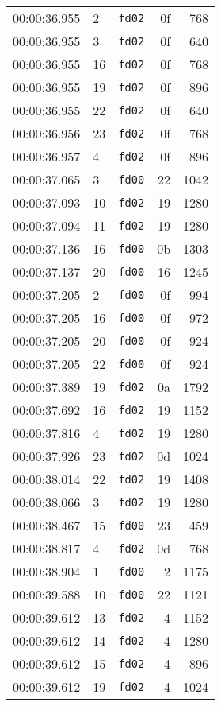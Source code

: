 \documentclass{article}
\begin{document}
\begin{longtable}{lllrr}
00:00:36.955 & 2 & \texttt{fd02} & 0f & 768 \\
00:00:36.955 & 3 & \texttt{fd02} & 0f & 640 \\
00:00:36.955 & 16 & \texttt{fd02} & 0f & 768 \\
00:00:36.955 & 19 & \texttt{fd02} & 0f & 896 \\
00:00:36.955 & 22 & \texttt{fd02} & 0f & 640 \\
00:00:36.956 & 23 & \texttt{fd02} & 0f & 768 \\
00:00:36.957 & 4 & \texttt{fd02} & 0f & 896 \\
00:00:37.065 & 3 & \texttt{fd00} & 22 & 1042 \\
00:00:37.093 & 10 & \texttt{fd02} & 19 & 1280 \\
00:00:37.094 & 11 & \texttt{fd02} & 19 & 1280 \\
00:00:37.136 & 16 & \texttt{fd00} & 0b & 1303 \\
00:00:37.137 & 20 & \texttt{fd00} & 16 & 1245 \\
00:00:37.205 & 2 & \texttt{fd00} & 0f & 994 \\
00:00:37.205 & 16 & \texttt{fd00} & 0f & 972 \\
00:00:37.205 & 20 & \texttt{fd00} & 0f & 924 \\
00:00:37.205 & 22 & \texttt{fd00} & 0f & 924 \\
00:00:37.389 & 19 & \texttt{fd02} & 0a & 1792 \\
00:00:37.692 & 16 & \texttt{fd02} & 19 & 1152 \\
00:00:37.816 & 4 & \texttt{fd02} & 19 & 1280 \\
00:00:37.926 & 23 & \texttt{fd02} & 0d & 1024 \\
00:00:38.014 & 22 & \texttt{fd02} & 19 & 1408 \\
00:00:38.066 & 3 & \texttt{fd02} & 19 & 1280 \\
00:00:38.467 & 15 & \texttt{fd00} & 23 & 459 \\
00:00:38.817 & 4 & \texttt{fd02} & 0d & 768 \\
00:00:38.904 & 1 & \texttt{fd00} & 2 & 1175 \\
00:00:39.588 & 10 & \texttt{fd00} & 22 & 1121 \\
00:00:39.612 & 13 & \texttt{fd02} & 4 & 1152 \\
00:00:39.612 & 14 & \texttt{fd02} & 4 & 1280 \\
00:00:39.612 & 15 & \texttt{fd02} & 4 & 896 \\
00:00:39.612 & 19 & \texttt{fd02} & 4 & 1024 \\

\end{longtable}
\end{document}
